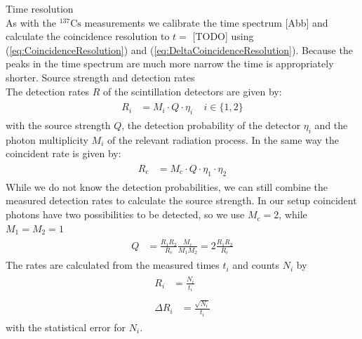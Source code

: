 %
Time resolution \\
%
As with the $^{137}\text{Cs}$ measurements we calibrate the time spectrum [Abb] and calculate the coincidence resolution to $t = $ [TODO] using (\ref{eq:CoincidenceResolution}) and (\ref{eq:DeltaCoincidenceResolution}).
Because the peaks in the time spectrum are much more narrow the time is appropriately shorter.
%
Source strength and detection rates\\
%
The detection rates $R$ of the scintillation detectors are given by:
%
\begin{align}
    \label{eq:DetectionRates}
    \begin{split}
        R_i &= M_i \cdot Q \cdot \eta_i ~~~~~ i \in \{1,2\}
    \end{split}
\end{align}
%
with the source strength $Q$, the detection probability of the detector $\eta_i$ and the photon multiplicity $M_i$ of the relevant radiation process.
In the same way the coincident rate is given by:
%
\begin{align}
    \label{eq:CoincidenceDetectionRates}
    \begin{split}
        R_{\text{c}} &= M_{\text{c}} \cdot Q \cdot \eta_1 \cdot \eta_2
    \end{split}
\end{align}
%
While we do not know the detection probabilities, we can still combine the measured detection rates to calculate the source strength. In our setup coincident photons have two possibilities to be detected, so we use $M_{\text{c}} = 2$, while $M_1 = M_2 = 1$
%
\begin{align}
    \label{eq:SourceStrength}
    \begin{split}
        Q &= \frac{R_1 R_2}{R_{\text{c}}} \frac{ M_{\text{c}}}{M_1 M_2} = 2 \frac{R_1 R_2}{R_{\text{c}}}
    \end{split}
\end{align}
%
The rates are calculated from the measured times $t_i$ and counts $N_i$ by
%
\begin{align}
    \label{eq:RateMeasured}
    \begin{split}
        R_i  &= \frac{N_i}{t_i}
    \end{split}
    \\
    \label{eq:DeltaRateMeasured}
    \begin{split}
        \Delta R_i &= \frac{\sqrt{N_i}}{t_i}
    \end{split}
\end{align}
%
with the statistical error for $N_i$.
